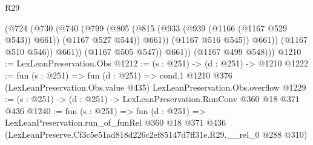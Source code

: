 \begin{lexlean}{R29}
\begin{coremodule}
                    (@724
                      (@730
                        (@740
                          (@799
                            (@805
                              (@815 (@933 (@939 (@1166 (@1167 @529 @543)) @661)) (@1167 @527 @544))
                              @661))
                          (@1167 @516 @545))
                        @661))
                    (@1167 @510 @546))
                  @661))
              (@1167 @505 @547))
            @661))
        (@1167 @499 @548)))
@1210 := LexLeanPreservation.Obs
@1212 := (s : @251) -> (d : @251) -> @1210
@1222 := fun (s : @251) =>
  fun (d : @251) =>
  cond.{1} @1210 @376 (LexLeanPreservation.Obs.value @435) LexLeanPreservation.Obs.overflow
@1229 := (s : @251) -> (d : @251) -> LexLeanPreservation.RunConv @360 @18 @371 @436
@1240 := fun (s : @251) =>
  fun (d : @251) =>
  LexLeanPreservation.run_of_funRel
    @360
    @18
    @371
    @436
    (LexLeanPreserve.Cf3c5e51ad818d226c2ef85147d7ff31e.R29.__rel_0 @288 @310)
\end{coremodule}
\end{lexlean}
